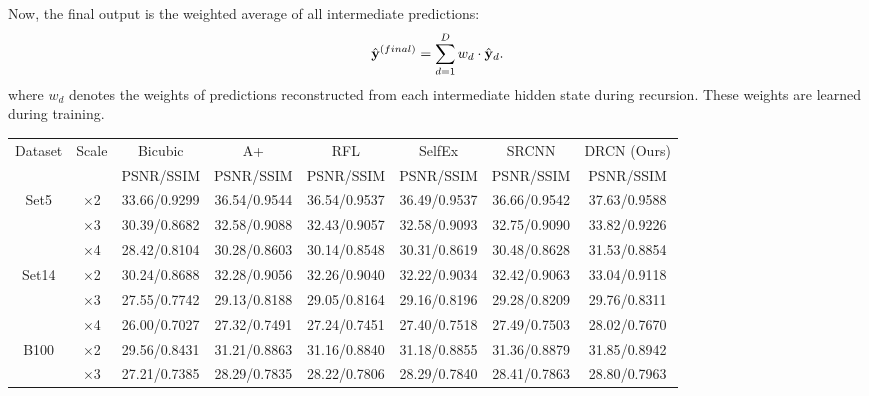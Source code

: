 \documentclass[10pt,twocolumn,letterpaper]{article}
\begin{document}
Now, the final output is the weighted average of all intermediate predictions:
\begin{equation}
\hat{{\bf y}}^{(final)} = \sum_{d=1}^{D} w_d \cdot \hat{{\bf y}}_d.
\end{equation}
where $w_d$ denotes the weights of predictions reconstructed from each intermediate hidden state during recursion. These weights are learned during training.


\begin{table}
\begin{center}
\setlength{\tabcolsep}{2pt}
\small
\begin{tabular}{ | c | c | c | c | c | c | c | c | }
\hline
\multirow{2}{*}{Dataset} & \multirow{2}{*}{Scale} & Bicubic & A+ & RFL & SelfEx & SRCNN & DRCN (Ours)\\
 & & PSNR/SSIM & PSNR/SSIM & PSNR/SSIM & PSNR/SSIM & PSNR/SSIM & PSNR/SSIM\\
\hline
\hline
\multirow{3}{*}{Set5} & $\times$2 & 33.66/0.9299 & 36.54/{\color{blue}0.9544} & 36.54/0.9537 & 36.49/0.9537 & {\color{blue}36.66}/0.9542 & {\color{red}37.63}/{\color{red}0.9588}\\
 & $\times$3 & 30.39/0.8682 & 32.58/0.9088 & 32.43/0.9057 & 32.58/{\color{blue}0.9093} & {\color{blue}32.75}/0.9090 & {\color{red}33.82}/{\color{red}0.9226}\\
 & $\times$4 & 28.42/0.8104 & 30.28/0.8603 & 30.14/0.8548 & 30.31/0.8619 & {\color{blue}30.48}/{\color{blue}0.8628} & {\color{red}31.53}/{\color{red}0.8854}\\
\hline
\hline
\multirow{3}{*}{Set14} & $\times$2 & 30.24/0.8688 & 32.28/0.9056 & 32.26/0.9040 & 32.22/0.9034 & {\color{blue}32.42}/{\color{blue}0.9063} & {\color{red}33.04}/{\color{red}0.9118}\\
 & $\times$3 & 27.55/0.7742 & 29.13/0.8188 & 29.05/0.8164 & 29.16/0.8196 & {\color{blue}29.28}/{\color{blue}0.8209} & {\color{red}29.76}/{\color{red}0.8311}\\
 & $\times$4 & 26.00/0.7027 & 27.32/0.7491 & 27.24/0.7451 & 27.40/{\color{blue}0.7518} & {\color{blue}27.49}/0.7503 & {\color{red}28.02}/{\color{red}0.7670}\\
\hline
\hline
\multirow{3}{*}{B100} & $\times$2 & 29.56/0.8431 & 31.21/0.8863 & 31.16/0.8840 & 31.18/0.8855 & {\color{blue}31.36}/{\color{blue}0.8879} & {\color{red}31.85}/{\color{red}0.8942}\\
 & $\times$3 & 27.21/0.7385 & 28.29/0.7835 & 28.22/0.7806 & 28.29/0.7840 & {\color{blue}28.41}/{\color{blue}0.7863} & {\color{red}28.80}/{\color{red}0.7963}\\

\end{tabular}
\end{center}
\end{table}
\end{document}
